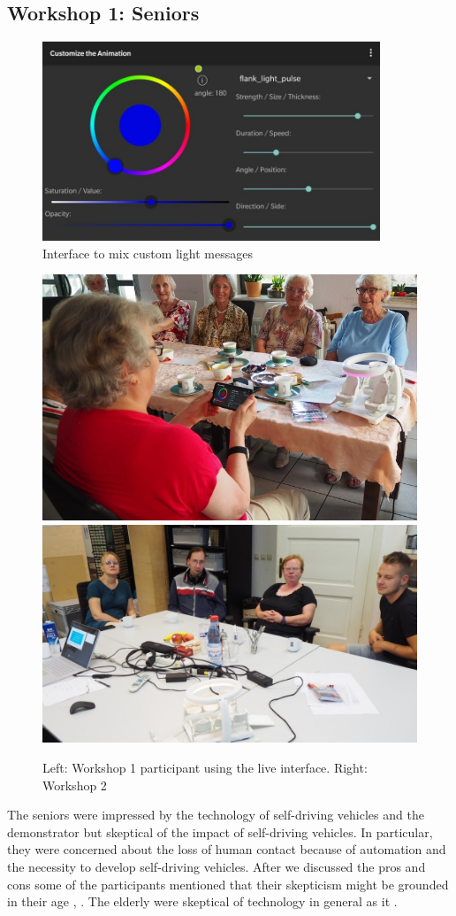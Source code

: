 \subsection{Workshop 1: Seniors}
\begin{figure}
    \includegraphics[width=0.9\textwidth]{fig/customAniShrunk.jpg}
    \caption[Light mixing interface]{Interface to mix custom light messages}
    \label{fig:liveinterface}
\end{figure}
\begin{figure}
    \includegraphics[height=0.3\textwidth]{fig/omis.jpg}\hfill\includegraphics[height=0.3\textwidth]{fig/workshop2.JPG}
    \caption[Workshop]{Left: Workshop 1 participant using the live interface. Right: Workshop 2}
    \label{fig:workshop}
\end{figure}
The seniors were impressed by the technology of self-driving vehicles and the demonstrator but skeptical of the impact of self-driving vehicles. In particular, they were concerned about the loss of human contact because of automation and the necessity to develop self-driving vehicles. After we discussed the pros and cons some of the participants mentioned that their skepticism might be grounded in their age , . The elderly were skeptical of technology in general as it . 

